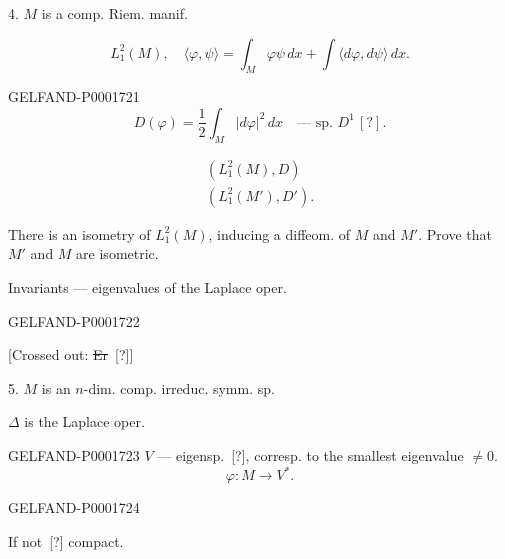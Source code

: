 4. $M$ is a comp. Riem. manif.

\begin{equation*}
L_1^2(M),\quad \langle\varphi,\psi\rangle
=\int_M\varphi\psi\, dx+\int\langle d\varphi, d\psi\rangle\, dx.
\end{equation*}



\begin{GelfandAdjacentEvidence}{GELFAND-P000172}{1}
\begin{equation*}
D (\varphi)=\frac12\int_M|d\varphi|^2\, dx\quad\text{— sp. }D^1\, [?].
\end{equation*}
\end{GelfandAdjacentEvidence}

\begin{gather*}
(L_1^2(M), D)\\
(L_1^2(M'), D').
\end{gather*}


There is an isometry of $L_1^2(M)$, inducing a diffeom. of $M$ and $M'$.
Prove that $M'$ and $M$ are isometric.

Invariants — eigenvalues of the Laplace oper.

\begin{GelfandAdjacentEvidence}{GELFAND-P000172}{2}

[Crossed out: \sout{Er}\, [?]]
\end{GelfandAdjacentEvidence}

5. $M$ is an $n$-dim. comp. irreduc. symm. sp.

$\Delta$ is the Laplace oper.

\begin{GelfandAdjacentEvidence}{GELFAND-P000172}{3}
$V$ — eigensp.\, [?], corresp. to the smallest eigenvalue $\ne0$.
\begin{equation*}\varphi: M\longrightarrow V^*.\end{equation*}
\end{GelfandAdjacentEvidence}
\begin{GelfandAdjacentEvidence}{GELFAND-P000172}{4}

If not\, [?] compact.
\end{GelfandAdjacentEvidence}



